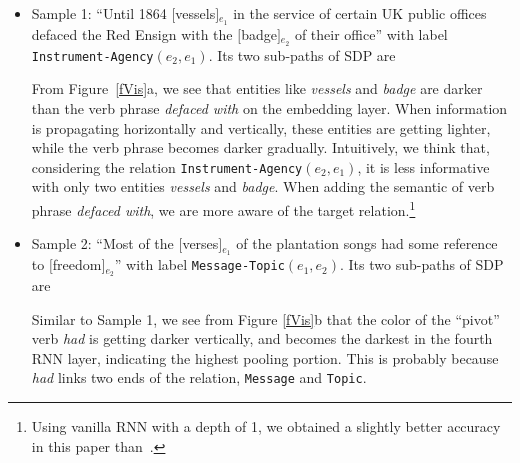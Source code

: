 \documentclass[11pt]{article}
\begin{document}
\bigskip
\begin{itemize}

\item Sample 1: ``Until 1864 $[$vessels$]$$_{e_1}$ in the service of certain UK public offices defaced the Red Ensign with the $[$badge$]$$_{e_2}$ of their office'' with label \verb|Instrument-Agency|$({e_2}, {e_1})$.
    Its two sub-paths of SDP are
    From Figure~\ref{fVis}a, we see that entities like \textit{vessels} and \textit{badge}
    are darker than the verb phrase \textit{defaced with} on the embedding layer.
    When information is propagating horizontally and vertically, these entities are getting lighter, while the verb phrase becomes darker gradually.
    Intuitively, we think that, considering the relation \verb|Instrument-Agency|$({e_2}, {e_1})$, it is less informative with only two entities \textit{vessels} and \textit{badge}.
    When adding the semantic of verb phrase \textit{defaced with}, we are more aware of the target relation.{\color{white}\footnote{ Using vanilla RNN with a depth of 1, we obtained a slightly better accuracy in this paper than~.}}

\item Sample 2: ``Most of the $[$verses$]$$_{e_1}$ of the plantation songs had some reference to $[$freedom$]$$_{e_2}$'' with label \verb|Message-Topic|$({e_1}, {e_2})$.
    Its two sub-paths of SDP are
    Similar to Sample 1, we see from Figure \ref{fVis}b that the color of the ``pivot'' verb \textit{had} is getting darker vertically, and becomes the darkest in the fourth RNN layer, indicating the highest pooling portion.
    This is probably because \textit{had} links two ends of the relation, \verb|Message| and \verb|Topic|.



\end{itemize}
\end{document}
